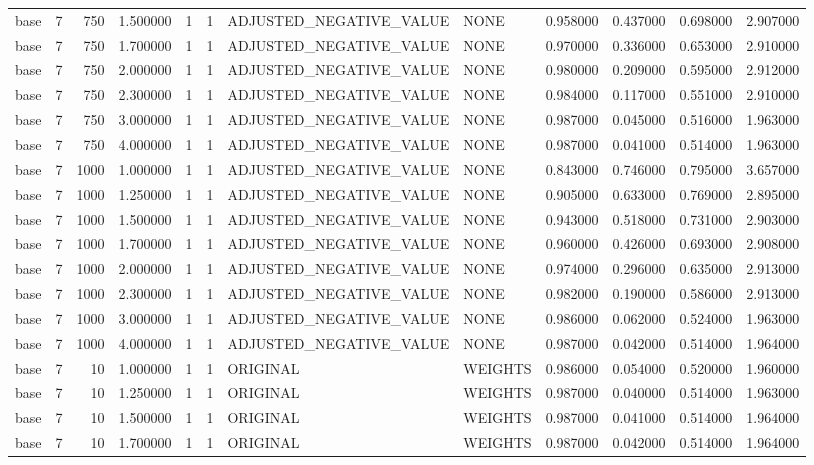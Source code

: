 \begin{tabular}{lrrrllllrrrr}
base & 7 & 750 & 1.500000 & 1 & 1 & ADJUSTED_NEGATIVE_VALUE & NONE & 0.958000 & 0.437000 & 0.698000 & 2.907000 \\
base & 7 & 750 & 1.700000 & 1 & 1 & ADJUSTED_NEGATIVE_VALUE & NONE & 0.970000 & 0.336000 & 0.653000 & 2.910000 \\
base & 7 & 750 & 2.000000 & 1 & 1 & ADJUSTED_NEGATIVE_VALUE & NONE & 0.980000 & 0.209000 & 0.595000 & 2.912000 \\
base & 7 & 750 & 2.300000 & 1 & 1 & ADJUSTED_NEGATIVE_VALUE & NONE & 0.984000 & 0.117000 & 0.551000 & 2.910000 \\
base & 7 & 750 & 3.000000 & 1 & 1 & ADJUSTED_NEGATIVE_VALUE & NONE & 0.987000 & 0.045000 & 0.516000 & 1.963000 \\
base & 7 & 750 & 4.000000 & 1 & 1 & ADJUSTED_NEGATIVE_VALUE & NONE & 0.987000 & 0.041000 & 0.514000 & 1.963000 \\
base & 7 & 1000 & 1.000000 & 1 & 1 & ADJUSTED_NEGATIVE_VALUE & NONE & 0.843000 & 0.746000 & 0.795000 & 3.657000 \\
base & 7 & 1000 & 1.250000 & 1 & 1 & ADJUSTED_NEGATIVE_VALUE & NONE & 0.905000 & 0.633000 & 0.769000 & 2.895000 \\
base & 7 & 1000 & 1.500000 & 1 & 1 & ADJUSTED_NEGATIVE_VALUE & NONE & 0.943000 & 0.518000 & 0.731000 & 2.903000 \\
base & 7 & 1000 & 1.700000 & 1 & 1 & ADJUSTED_NEGATIVE_VALUE & NONE & 0.960000 & 0.426000 & 0.693000 & 2.908000 \\
base & 7 & 1000 & 2.000000 & 1 & 1 & ADJUSTED_NEGATIVE_VALUE & NONE & 0.974000 & 0.296000 & 0.635000 & 2.913000 \\
base & 7 & 1000 & 2.300000 & 1 & 1 & ADJUSTED_NEGATIVE_VALUE & NONE & 0.982000 & 0.190000 & 0.586000 & 2.913000 \\
base & 7 & 1000 & 3.000000 & 1 & 1 & ADJUSTED_NEGATIVE_VALUE & NONE & 0.986000 & 0.062000 & 0.524000 & 1.963000 \\
base & 7 & 1000 & 4.000000 & 1 & 1 & ADJUSTED_NEGATIVE_VALUE & NONE & 0.987000 & 0.042000 & 0.514000 & 1.964000 \\
base & 7 & 10 & 1.000000 & 1 & 1 & ORIGINAL & WEIGHTS & 0.986000 & 0.054000 & 0.520000 & 1.960000 \\
base & 7 & 10 & 1.250000 & 1 & 1 & ORIGINAL & WEIGHTS & 0.987000 & 0.040000 & 0.514000 & 1.963000 \\
base & 7 & 10 & 1.500000 & 1 & 1 & ORIGINAL & WEIGHTS & 0.987000 & 0.041000 & 0.514000 & 1.964000 \\
base & 7 & 10 & 1.700000 & 1 & 1 & ORIGINAL & WEIGHTS & 0.987000 & 0.042000 & 0.514000 & 1.964000 \\

\end{tabular}
